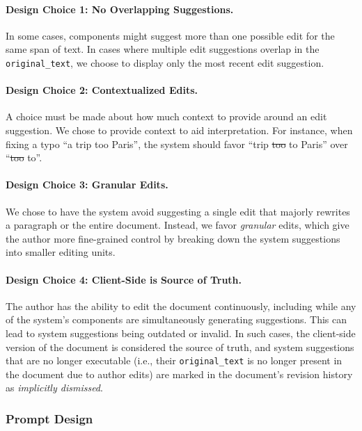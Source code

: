 \documentclass[manuscript]{acmart}
\begin{document}
\paragraph{Design Choice 1: No Overlapping Suggestions.} In some cases, components might suggest more than one possible edit for the same span of text. In cases where multiple edit suggestions overlap in the \texttt{original\_text}, we choose to display only the most recent edit suggestion.

\paragraph{Design Choice 2: Contextualized Edits.} A choice must be made about how much context to provide around an edit suggestion. We chose to provide context to aid interpretation. For instance, when fixing a typo ``a trip too Paris'', the system should favor ``trip \textcolor{colordel}{\sout{too}} \textcolor{colorins}{to} Paris'' over ``\textcolor{colordel}{\sout{too}} \textcolor{colorins}{to}''.

\paragraph{Design Choice 3: Granular Edits.} We chose to have the system avoid suggesting a single edit that majorly rewrites a paragraph or the entire document. Instead, we favor \textit{granular} edits, which give the author more fine-grained control by breaking down the system suggestions into smaller editing units.

\paragraph{Design Choice 4: Client-Side is Source of Truth.} The author has the ability to edit the document continuously, including while any of the system's components are simultaneously generating suggestions. This can lead to system suggestions being outdated or invalid. In such cases, the client-side version of the document is considered the source of truth, and system suggestions that are no longer executable (i.e., their \texttt{original\_text} is no longer present in the document due to author edits) are marked in the document's revision history as \textit{implicitly dismissed}.

\subsubsection{Prompt Design} \label{sec:prompt_design}
\end{document}
